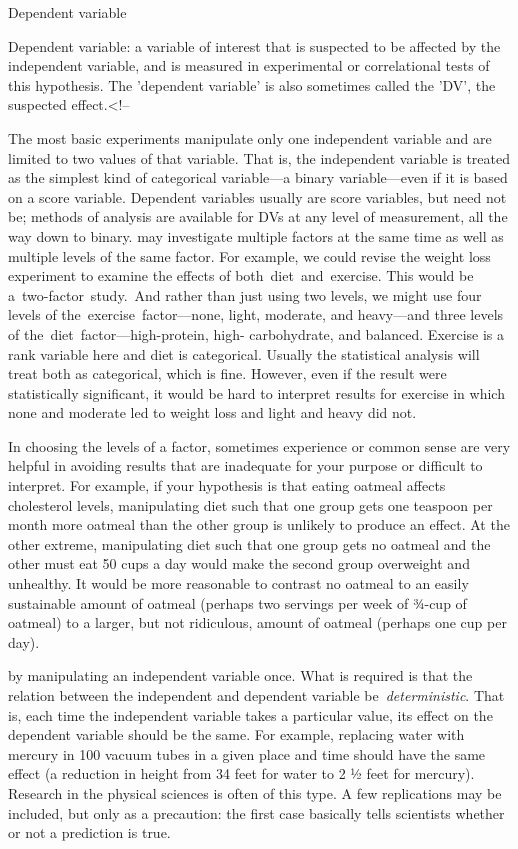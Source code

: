 \begin{refsection}
Dependent variable
\begin{thesis}
Dependent variable: a variable of interest that is suspected to be affected by the independent variable, and is measured in experimental or correlational tests of this hypothesis.
\newline
The 'dependent variable' is also sometimes called the 'DV', the suspected effect.<!--\end{thesis}
The most basic experiments manipulate only one independent variable and are limited to two values of that variable. That is, the independent variable is treated as the simplest kind of categorical variable---a binary variable---even if it is based on a score variable. Dependent variables usually are score variables, but need not be; methods of analysis are available for DVs at any level of measurement, all the way down to binary.
 may investigate multiple factors at the same time as well as multiple levels of the same factor. For example, we could revise the weight loss experiment to examine the effects of both diet and exercise. This would be a two-factor study. And rather than just using two levels, we might use four levels of the exercise factor---none, light, moderate, and heavy---and three levels of the diet factor---high-protein, high- carbohydrate, and balanced. Exercise is a rank variable here and diet is categorical. Usually the statistical analysis will treat both as categorical, which is fine. However, even if the result were statistically significant, it would be hard to interpret results for exercise in which none and moderate led to weight loss and light and heavy did not.

In choosing the levels of a factor, sometimes experience or common sense are very helpful in avoiding results that are inadequate for your purpose or difficult to interpret. For example, if your hypothesis is that eating oatmeal affects cholesterol levels, manipulating diet such that one group gets one teaspoon per month more oatmeal than the other group is unlikely to produce an effect. At the other extreme, manipulating diet such that one group gets no oatmeal and the other must eat 50 cups a day would make the second group overweight and unhealthy. It would be more reasonable to contrast no oatmeal to an easily sustainable amount of oatmeal (perhaps two servings per week of ¾-cup of oatmeal) to a larger, but not ridiculous, amount of oatmeal (perhaps one cup per day).

 by manipulating an independent variable once. What is required is that the relation between the independent and dependent variable be \emph{deterministic}. That is, each time the independent variable takes a particular value, its effect on the dependent variable should be the same. For example, replacing water with mercury in 100 vacuum tubes in a given place and time should have the same effect (a reduction in height from 34 feet for water to 2 ½ feet for mercury). Research in the physical sciences is often of this type. A few replications may be included, but only as a precaution: the first case basically tells scientists whether or not a prediction is true.


\end{refsection}
